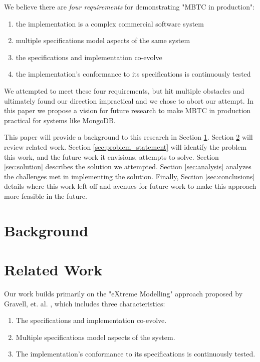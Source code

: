 \documentclass{vldb}
\begin{document}
We believe there are \textit{four requirements} for demonstrating "MBTC in production":
\begin{enumerate}
\item the implementation is a complex commercial software system
\item multiple specifications model aspects of the same system
\item the specifications and implementation co-evolve
\item the implementation's conformance to its specifications is continuously tested
\end{enumerate}


We attempted to meet these four requirements, but hit multiple obstacles and ultimately found our direction impractical and we chose to abort our attempt.
In this paper we propose a vision for future research to make MBTC in production practical for systems like MongoDB.

This paper will provide a background to this research in Section \ref{sec:background}. Section \ref{sec:related_work} will review related work. Section \ref{sec:problem_statement} will identify the problem this work, and the future work it envisions, attempts to solve. Section \ref{sec:solution} describes the solution we attempted. Section \ref{sec:analysis} analyzes the challenges met in implementing the solution. Finally, Section \ref{sec:conclusions} details where this work left off and avenues for future work to make this approach more feasible in the future.

\section{Background}
\label{sec:background}


\section{Related Work}
\label{sec:related_work}

Our work builds primarily on the "eXtreme Modelling" approach proposed by Gravell, et. al. \cite{Gravell11ConcurrentDevelopmentOfModelAndImplementation}, which includes three characteristics:

\begin{enumerate}
\item The specifications and implementation co-evolve.
\item Multiple specifications model aspects of the system.
\item The implementation's conformance to its specifications is continuously tested.
\end{enumerate}
\end{document}
